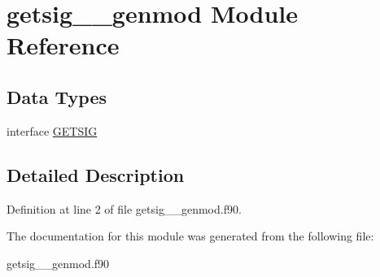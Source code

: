 \hypertarget{classgetsig____genmod}{\section{getsig\+\_\+\+\_\+genmod Module Reference}
\label{classgetsig____genmod}
}
\subsection*{Data Types}
\begin{DoxyCompactItemize}
\item 
interface \hyperlink{interfacegetsig____genmod_1_1_g_e_t_s_i_g}{G\+E\+T\+S\+I\+G}
\end{DoxyCompactItemize}


\subsection{Detailed Description}


Definition at line 2 of file getsig\+\_\+\+\_\+genmod.\+f90.



The documentation for this module was generated from the following file\+:\begin{DoxyCompactItemize}
\item 
getsig\+\_\+\+\_\+genmod.\+f90\end{DoxyCompactItemize}
